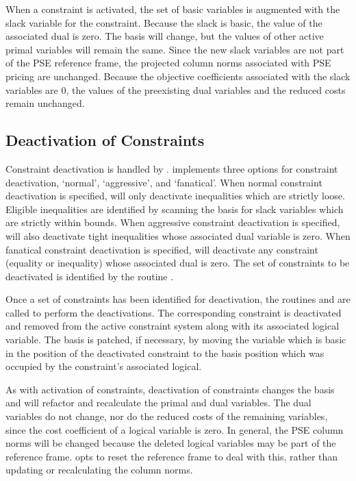 When a constraint is activated, the set of basic variables is augmented
with the slack variable for the constraint.
Because the slack is basic, the value of the associated dual is zero.
The basis will change, but the values of other active primal variables will
remain the same.
Since the new slack variables are not part of the PSE reference frame,
the projected column norms associated with PSE pricing are unchanged.
Because the objective coefficients associated with the slack variables
are 0, the values of the preexisting dual variables and the reduced costs
remain unchanged.

\subsection{Deactivation of Constraints}

Constraint deactivation is handled by .
\dylp implements three options for constraint deactivation, `normal',
`aggressive', and `fanatical'.
When normal constraint deactivation is specified, \dylp will only deactivate
inequalities which are strictly loose.
Eligible inequalities are identified by scanning the basis for slack
variables which are strictly within bounds.
When aggressive constraint deactivation is specified, \dylp will
also deactivate tight inequalities whose associated dual
variable is zero.
When fanatical constraint deactivation is specified, \dylp will deactivate any
constraint (equality or inequality) whose associated dual is zero.
The set of constraints to be deactivated is identified by the routine
.

Once a set of constraints has been identified for deactivation, the routines
 and  are called to
perform the deactivations.
The corresponding constraint is deactivated and removed from the active
constraint system along with its associated logical variable.
The basis is patched, if necessary, by moving the variable which is basic
in the position of the deactivated constraint to the basis position which was
occupied by the constraint's associated logical.

As with activation of constraints, deactivation of constraints changes
the basis and \dylp will refactor and recalculate the primal and dual
variables.
The dual variables do not change, nor do the reduced costs of the remaining
variables, since the cost coefficient of a logical variable is zero.
In general, the PSE column norms will be changed because the
deleted logical variables may be part of the reference frame.
\dylp opts to reset the reference frame to deal with this, rather than
updating or recalculating the column norms.

